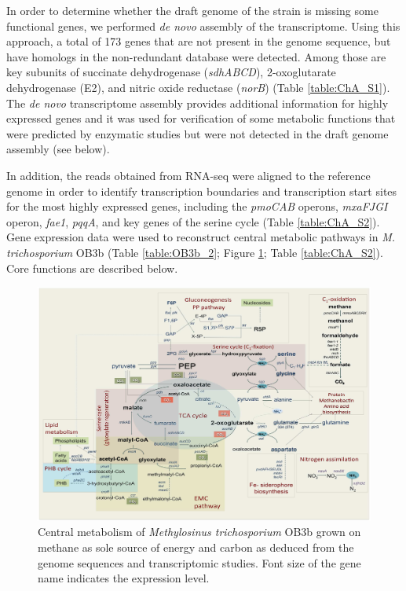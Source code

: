 In order to determine whether the draft genome of the strain is missing some functional genes, we performed \textit{de novo} assembly of the transcriptome.
Using this approach, a total of 173 genes that are not present in the genome sequence, but have homologs in the non-redundant database were detected.
Among those are key subunits of succinate dehydrogenase (\textit{sdhABCD}), 2-oxoglutarate dehydrogenase (E2), and nitric oxide reductase (\textit{norB}) (Table \ref{table:ChA_S1}).
The \textit{de novo} transcriptome assembly provides additional information for highly expressed genes and it was used for verification of some metabolic functions that were predicted by enzymatic studies but were not detected in the draft genome assembly (see below).

In addition, the reads obtained from RNA-seq were aligned to the reference genome in order to identify transcription boundaries and transcription start sites for the most highly expressed genes, including the \textit{pmoCAB} operons, \textit{mxaFJGI} operon, \textit{fae1}, \textit{pqqA}, and key genes of the serine cycle (Table \ref{table:ChA_S2}).
Gene expression data were used to reconstruct central metabolic pathways in \textit{M. trichosporium} OB3b (Table \ref{table:OB3b_2}; Figure \ref{fig:A_metabolic_map}; Table \ref{table:ChA_S2}).
Core functions are described below.


\begin{figure}[H]
\centering
     \includegraphics[width=1.0\textwidth]{./tex/chapter1/figures/figure1.png}
     \begin{singlespace}
     \caption[Central metabolism of \textit{Methylosinus trichosporium} OB3b]{
        Central metabolism of \textit{Methylosinus trichosporium} OB3b grown on methane as sole source of energy and carbon as
        deduced from the genome sequences and transcriptomic studies.
        Font size of the gene name indicates the expression level.}
     \label{fig:A_metabolic_map}  %
     \end{singlespace}
\end{figure}

